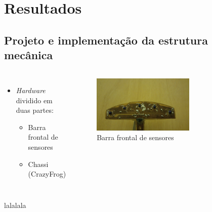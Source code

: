\section{Resultados}


\subsection{Projeto e implementação da estrutura mecânica}

\begin{frame}
\begin{columns}

	\begin{itemize}
	\item \textit{Hardware} dividido em duas partes:
		\begin{itemize}
		\item Barra frontal de sensores
		\item Chassi (CrazyFrog)
		\end{itemize}
	\end{itemize}
	
	\begin{figure}[th]
	\centering
	\captionsetup{width=0.65\textwidth,font=footnotesize,textfont=bf}
	\includegraphics[width=0.65\textwidth,keepaspectratio]{Figuras/Barraluz.jpg}
	\caption{Barra frontal de sensores}
	\end{figure}

\end{columns}
\end{frame}

\begin{frame}
lalalala
\end{frame}



